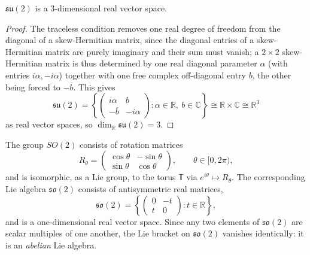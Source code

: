 \begin{proposition}
    \label{prop:su2-dimension}
    \( \mathfrak{su}(2) \) is a \( 3 \)-dimensional real vector space.
\end{proposition}

\begin{proof}
    The traceless condition removes one real degree of freedom from
    the diagonal of a skew-Hermitian matrix, since the diagonal
    entries of a skew-Hermitian matrix are purely imaginary and their
    sum must vanish; a \( 2\times 2 \) skew-Hermitian matrix is thus
    determined by one real diagonal parameter \( \alpha \) (with
    entries \( i\alpha, -i\alpha \)) together with one free complex
    off-diagonal entry \( b \), the other being forced to
    \( -\overline{b} \). This gives
    \[
        \mathfrak{su}(2) = \left\{
            \begin{pmatrix}
                i\alpha & b \\
                -\overline{b} & -i\alpha
            \end{pmatrix}
            : \alpha \in \mathbb{R},\ b \in \mathbb{C}
        \right\}
        \cong \mathbb{R} \times \mathbb{C} \cong \mathbb{R}^3
    \]
    as real vector spaces, so \( \dim_{\mathbb{R}} \mathfrak{su}(2) = 3 \).
\end{proof}

\begin{example}
    \label{example:so2}
    The group \( SO(2) \) consists of rotation matrices
    \[
        R_\theta =
        \begin{pmatrix} \cos\theta & -\sin\theta \\ \sin\theta & \cos\theta
        \end{pmatrix},
        \qquad \theta \in [0, 2\pi),
    \]
    and is isomorphic, as a Lie group, to the torus \( \mathbb{T} \) via
    \( e^{i \theta} \mapsto R_\theta \). The corresponding Lie
    algebra \( \mathfrak{so}(2) \) consists of antisymmetric real
    matrices,
    \[
        \mathfrak{so}(2) = \left\{
            \begin{pmatrix} 0 & -t \\ t & 0
        \end{pmatrix} : t \in \mathbb{R} \right\},
    \]
    and is a one-dimensional real vector space. Since any two elements of
    \( \mathfrak{so}(2) \) are scalar multiples of one another, the Lie
    bracket on \( \mathfrak{so}(2) \) vanishes identically: it is an
    \emph{abelian} Lie algebra.
\end{example}

